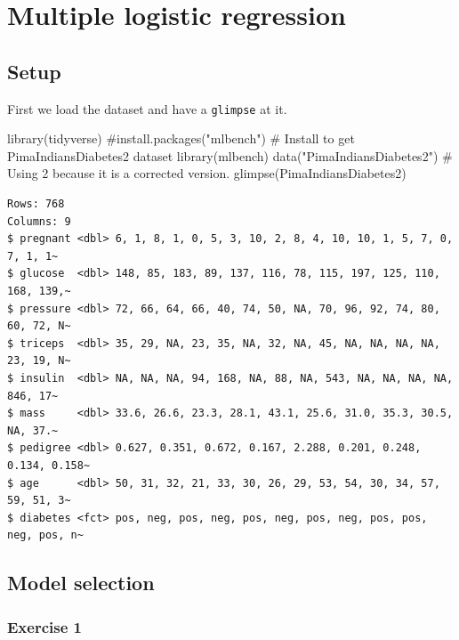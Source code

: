 \documentclass[
  letterpaper,
  DIV=11,
  numbers=noendperiod]{scrreprt}
\newenvironment{Shaded}{\begin{snugshade}}{\end{snugshade}}
\newcommand{\CommentTok}[1]{\textcolor[rgb]{0.37,0.37,0.37}{#1}}
\newcommand{\FunctionTok}[1]{\textcolor[rgb]{0.28,0.35,0.67}{#1}}
\newcommand{\NormalTok}[1]{\textcolor[rgb]{0.00,0.23,0.31}{#1}}
\newcommand{\StringTok}[1]{\textcolor[rgb]{0.13,0.47,0.30}{#1}}
\begin{document}
\chapter{Multiple logistic
regression}\label{multiple-logistic-regression-1}

\section{Setup}\label{setup-4}

First we load the dataset and have a \texttt{glimpse} at it.

\begin{Shaded}
\begin{Highlighting}[]
\FunctionTok{library}\NormalTok{(tidyverse)}
\CommentTok{\#install.packages("mlbench") \# Install to get PimaIndiansDiabetes2 dataset}
\FunctionTok{library}\NormalTok{(mlbench)}
\FunctionTok{data}\NormalTok{(}\StringTok{"PimaIndiansDiabetes2"}\NormalTok{) }\CommentTok{\# Using 2 because it is a corrected version.}
\FunctionTok{glimpse}\NormalTok{(PimaIndiansDiabetes2)}
\end{Highlighting}
\end{Shaded}

\begin{verbatim}
Rows: 768
Columns: 9
$ pregnant <dbl> 6, 1, 8, 1, 0, 5, 3, 10, 2, 8, 4, 10, 10, 1, 5, 7, 0, 7, 1, 1~
$ glucose  <dbl> 148, 85, 183, 89, 137, 116, 78, 115, 197, 125, 110, 168, 139,~
$ pressure <dbl> 72, 66, 64, 66, 40, 74, 50, NA, 70, 96, 92, 74, 80, 60, 72, N~
$ triceps  <dbl> 35, 29, NA, 23, 35, NA, 32, NA, 45, NA, NA, NA, NA, 23, 19, N~
$ insulin  <dbl> NA, NA, NA, 94, 168, NA, 88, NA, 543, NA, NA, NA, NA, 846, 17~
$ mass     <dbl> 33.6, 26.6, 23.3, 28.1, 43.1, 25.6, 31.0, 35.3, 30.5, NA, 37.~
$ pedigree <dbl> 0.627, 0.351, 0.672, 0.167, 2.288, 0.201, 0.248, 0.134, 0.158~
$ age      <dbl> 50, 31, 32, 21, 33, 30, 26, 29, 53, 54, 30, 34, 57, 59, 51, 3~
$ diabetes <fct> pos, neg, pos, neg, pos, neg, pos, neg, pos, pos, neg, pos, n~
\end{verbatim}

\section{Model selection}\label{model-selection-3}

\subsection{Exercise 1}\label{exercise-1-34}
\end{document}
